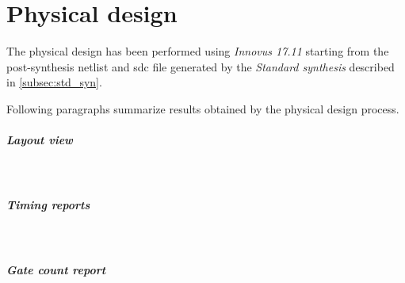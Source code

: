 \graphicspath{{./chapters/04-physical_design/figures/}}

\chapter{Physical design}
\label{chap:physical_design}
The physical design has been performed using \textit{Innovus 17.11} starting
from the post-synthesis netlist and sdc file generated by the \textit{Standard
synthesis} described in \ref{subsec:std_syn}.

\bigskip
Following paragraphs summarize results obtained by the physical design process.

\paragraph{Layout view} \mbox{} \\
\begin{figure}[H]
	\centering
	\label{fig:layout}
\end{figure}

\paragraph{Timing reports} \mbox{} \\
\lstset{
	basicstyle=\tiny,
	frame=single,
	breaklines=true
}



\paragraph{Gate count report} \mbox{} \\


